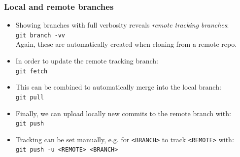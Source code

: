 \documentclass[compress,aspectratio=169]{beamer}
\newcommand{\console}[1]{
  \colorbox{bgcolor}{\texttt{#1}}
}
\begin{document}
\begin{frame}
  \frametitle{Local and remote branches}
  \begin{itemize}
    \item Showing branches with full verbosity reveals \textit{remote tracking branches}:\\\console{git branch -vv}\\Again, these are automatically created when cloning from a remote repo.
    \item In order to update the remote tracking branch:\\\console{git fetch}
    \item This can be combined to automatically merge into the local branch:\\\console{git pull}
    \item Finally, we can upload locally new commits to the remote branch with:\\\console{git push}
    \item Tracking can be set manually, e.g. for \texttt{<BRANCH>} to track \texttt{<REMOTE>} with:\\\console{git push -u <REMOTE> <BRANCH>}
  \end{itemize}
\end{frame}
\end{document}
